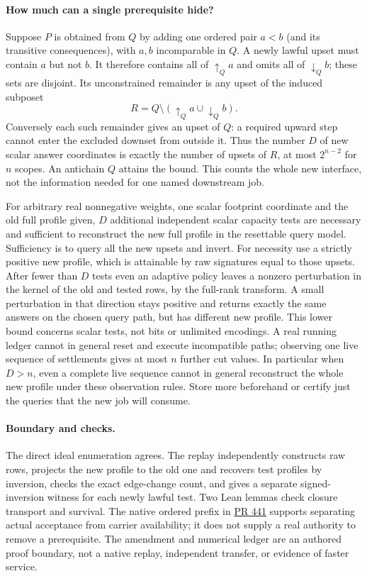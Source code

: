 \documentclass[11pt]{article}
\begin{document}
\paragraph{How much can a single prerequisite hide?}
Suppose \(P\) is obtained from \(Q\) by adding one ordered pair \(a<b\) (and its transitive consequences), with \(a,b\) incomparable in \(Q\). A newly lawful upset must contain \(a\) but not \(b\). It therefore contains all of \(\uparrow_Q a\) and omits all of \(\downarrow_Q b\); these sets are disjoint. Its unconstrained remainder is any upset of the induced subposet
\[
      R=Q\setminus (\uparrow_Q a\cup\downarrow_Q b).
\]
Conversely each such remainder gives an upset of \(Q\): a required upward step cannot enter the excluded downset from outside it. Thus the number \(D\) of new scalar answer coordinates is exactly the number of upsets of \(R\), at most \(2^{n-2}\) for \(n\) scopes. An antichain \(Q\) attains the bound. This counts the whole new interface, not the information needed for one named downstream job.
\par
For arbitrary real nonnegative weights, one scalar footprint coordinate and the old full profile given, \(D\) additional independent scalar capacity tests are necessary and sufficient to reconstruct the new full profile in the resettable query model. Sufficiency is to query all the new upsets and invert. For necessity use a strictly positive new profile, which is attainable by raw signatures equal to those upsets. After fewer than \(D\) tests even an adaptive policy leaves a nonzero perturbation in the kernel of the old and tested rows, by the full-rank transform. A small perturbation in that direction stays positive and returns exactly the same answers on the chosen query path, but has different new profile. This lower bound concerns scalar tests, not bits or unlimited encodings. A real running ledger cannot in general reset and execute incompatible paths; observing one live sequence of settlements gives at most \(n\) further cut values. In particular when \(D>n\), even a complete live sequence cannot in general reconstruct the whole new profile under these observation rules. Store more beforehand or certify just the queries that the new job will consume.
\paragraph{Boundary and checks.}
The direct ideal enumeration agrees. The replay independently constructs raw rows, projects the new profile to the old one and recovers test profiles by inversion, checks the exact edge-change count, and gives a separate signed-inversion witness for each newly lawful test. Two Lean lemmas check closure transport and survival. The native ordered prefix in \href{https://github.com/eternal-november/eos-research-programmes/pull/441}{PR 441} supports separating actual acceptance from carrier availability; it does not supply a real authority to remove a prerequisite. The amendment and numerical ledger are an authored proof boundary, not a native replay, independent transfer, or evidence of faster service.
\end{document}
